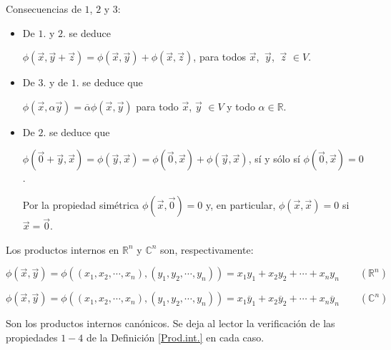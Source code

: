\bigskip


\bigskip


\begin{remark}
\label{ObsPI}


Consecuencias de $1$, $2$ y $3$:

\begin{itemize}
    
\item 

De $1.$  y $2.$ se deduce 

\bigskip



$\phi(\vec{x},\vec{y}+\vec{z}   )=\phi(\vec{x},\vec{y}) + \phi(\vec{x},\vec{z})$, para todos $ \vec{x}$, $ ~\vec{y}$, $ ~\vec{z} $ $\in V$.

\bigskip

\item 

De $3.$ y de $1.$ se deduce que 

\bigskip


$\phi(\vec{x},\alpha \vec{y})=\overline {\alpha }\phi(\vec{x},\vec{y})$ para todo $\vec{x}$, $\vec{y}$ $\in V$ y todo $\alpha \in \mathbb{R}$.



\bigskip

\item 

De $2.$ se deduce que 

\bigskip


$\phi(\vec{0}+\vec{y},\vec{x}   )=\phi(\vec{y},\vec{x}) = \phi(\vec{0},\vec{x})+ \phi(\vec{y},\vec{x})$, sí y sólo sí $\phi(\vec{0},\vec{x})=0$. 


\bigskip

Por la propiedad simétrica $\phi(\vec{x},\vec{0})=0$  y, en particular, $\phi(\vec{x},\vec{x})=0$ si $\vec{x}=\vec{0}$.




\end{itemize}
\end{remark}


\bigskip

\begin{example}

\newpage

Los productos internos  en $\mathbb{R}^n$  y $\mathbb{C}^n$ son,   respectivamente:
  
\bigskip

$$ \phi(\vec{x},\vec{y})= \phi((x_1, x_2, \cdots, x_n),  (y_1, y_2, \cdots, y_n))= x_1y_1+ x_2 y_2+ \cdots + x_ny_n   \qquad (\mathbb{R}^n) $$

 $$ \phi(\vec{x},\vec{y})= \phi((x_1, x_2, \cdots, x_n),  (y_1, y_2, \cdots, y_n))= x_1 \overline y_1+ x_2 \overline y_2+ \cdots + x_n\overline y_n  \qquad (\mathbb{C}^n)$$
 
\bigskip

Son los productos internos  canónicos.
Se deja al lector la verificación de las propiedades $1-4$ de la Definición \ref{Prod.int.} en cada caso.
\end{example}


